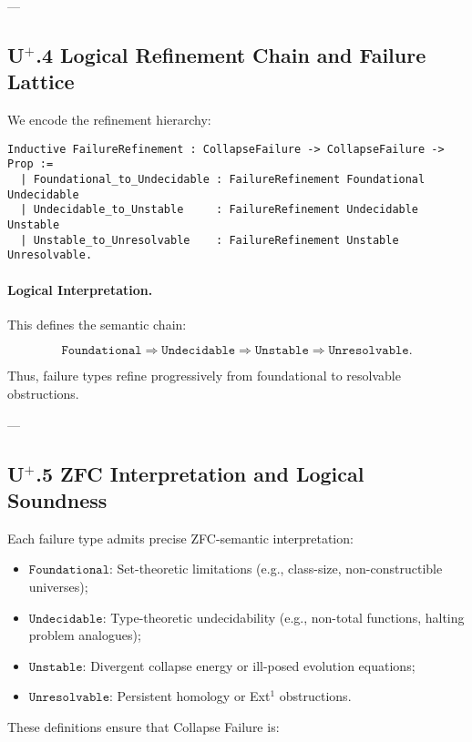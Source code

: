 \documentclass[11pt]{article}
\begin{document}
---

\subsection*{U$^{+}$.4 Logical Refinement Chain and Failure Lattice}

We encode the refinement hierarchy:

\begin{lstlisting}[language=Coq]
Inductive FailureRefinement : CollapseFailure -> CollapseFailure -> Prop :=
  | Foundational_to_Undecidable : FailureRefinement Foundational Undecidable
  | Undecidable_to_Unstable     : FailureRefinement Undecidable Unstable
  | Unstable_to_Unresolvable    : FailureRefinement Unstable Unresolvable.
\end{lstlisting}

\paragraph{Logical Interpretation.} This defines the semantic chain:

\[
\texttt{Foundational} \Rightarrow \texttt{Undecidable} \Rightarrow \texttt{Unstable} \Rightarrow \texttt{Unresolvable}.
\]

Thus, failure types refine progressively from foundational to resolvable obstructions.

---

\subsection*{U$^{+}$.5 ZFC Interpretation and Logical Soundness}

Each failure type admits precise ZFC-semantic interpretation:

\begin{itemize}
    \item $\texttt{Foundational}$: Set-theoretic limitations (e.g., class-size, non-constructible universes);
    \item $\texttt{Undecidable}$: Type-theoretic undecidability (e.g., non-total functions, halting problem analogues);
    \item $\texttt{Unstable}$: Divergent collapse energy or ill-posed evolution equations;
    \item $\texttt{Unresolvable}$: Persistent homology or Ext$^1$ obstructions.
\end{itemize}

These definitions ensure that Collapse Failure is:
\end{document}
